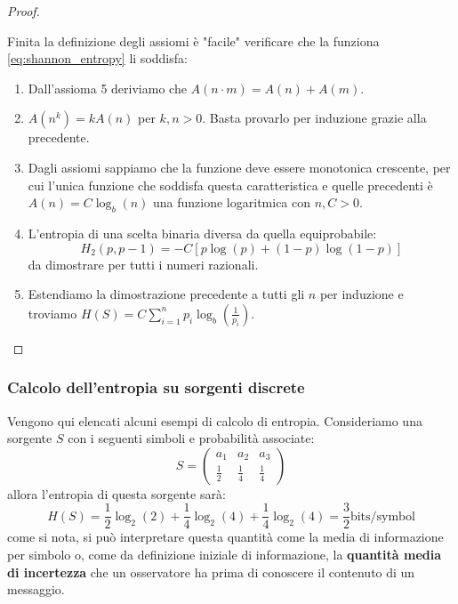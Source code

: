 \documentclass{article}
\theoremstyle{definition}
\numberwithin{equation}{section}
\begin{document}
\begin{proof}
\begin{enumerate}
    \end{enumerate}
    Finita la definizione degli assiomi è "facile" verificare che la funziona \eqref{eq:shannon_entropy} li soddisfa:
    \begin{enumerate}
        \item Dall'assioma 5 deriviamo che $A(n\cdot m)=A(n)+ A(m)$.
        \item $A(n^k)=kA(n)$ per $k,n>0$. Basta provarlo per induzione grazie alla precedente.
        \item Dagli assiomi sappiamo che la funzione deve essere monotonica crescente, per cui l'unica funzione che soddisfa questa caratteristica e quelle precedenti è $A(n)=C\log_b(n)$ una funzione logaritmica con $n,C>0$.
        \item L'entropia di una scelta binaria diversa da quella equiprobabile:
              \begin{equation*}
                  H_2(p, p-1)=-C\left[p\log (p)+(1-p)\log (1-p)\right]
              \end{equation*}
              da dimostrare per tutti i numeri razionali.
        \item Estendiamo la dimostrazione precedente a tutti gli $n$ per induzione e troviamo $ H(S)=C\sum_{i=1}^np_i\log_b\left(\frac{1}{p_i}\right)$.
    \end{enumerate}
\end{proof}
\subsubsection{Calcolo dell'entropia su sorgenti discrete}
Vengono qui elencati alcuni esempi di calcolo di entropia. Consideriamo una sorgente $S$ con i seguenti simboli e probabilità associate:
\begin{equation*}
    S=\begin{pmatrix}
        a_1         & a_2         & a_3         \\
        \frac{1}{2} & \frac{1}{4} & \frac{1}{4}
    \end{pmatrix}
\end{equation*}
allora l'entropia di questa sorgente sarà:
\begin{equation*}
    H(S)= \frac{1}{2}\log_2 (2)+\frac{1}{4}\log_2 (4)+\frac{1}{4}\log_2 (4)=\frac{3}{2} \text{bits/symbol}
\end{equation*}
come si nota, si può interpretare questa quantità come la media di informazione per simbolo o, come da definizione iniziale di informazione, la \textbf{quantità media di incertezza} che un osservatore ha prima di conoscere il contenuto di un messaggio.
\end{document}
